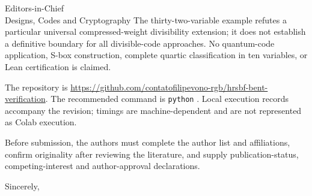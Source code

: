 \documentclass[11pt]{letter}
\begin{document}
\begin{letter}{Editors-in-Chief\\Designs, Codes and Cryptography}
The thirty-two-variable example refutes a particular universal compressed-weight divisibility extension; it does not establish a definitive boundary for all divisible-code approaches. No quantum-code application, S-box construction, complete quartic classification in ten variables, or Lean certification is claimed.

The repository is \url{https://github.com/contatofilipevono-rgb/hrsbf-bent-verification}. The recommended command is \texttt{python} . Local execution records accompany the revision; timings are machine-dependent and are not represented as Colab execution.

Before submission, the authors must complete the author list and affiliations, confirm originality after reviewing the literature, and supply publication-status, competing-interest and author-approval declarations.
\closing{Sincerely,}
\end{letter}
\end{document}
